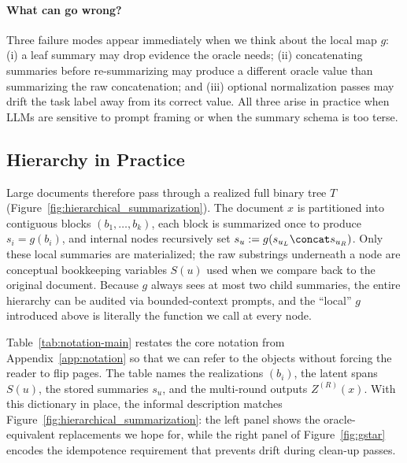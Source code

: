 \paragraph{What can go wrong?}
Three failure modes appear immediately when we think about the local map $g$: (i) a leaf summary may drop evidence the oracle needs; (ii) concatenating summaries before re-summarizing may produce a different oracle value than summarizing the raw concatenation; and (iii) optional normalization passes may drift the task label away from its correct value. All three arise in practice when LLMs are sensitive to prompt framing or when the summary schema is too terse.

\subsection{Hierarchy in Practice}

Large documents therefore pass through a realized full binary tree $T$ (Figure~\ref{fig:hierarchical_summarization}). The document $x$ is partitioned into contiguous blocks $(b_1,\dots,b_k)$, each block is summarized once to produce $s_i = g(b_i)$, and internal nodes recursively set $s_u := g(s_{u_L} \concat s_{u_R})$. Only these local summaries are materialized; the raw substrings underneath a node are conceptual bookkeeping variables $S(u)$ used when we compare back to the original document. Because $g$ always sees at most two child summaries, the entire hierarchy can be audited via bounded-context prompts, and the ``local'' $g$ introduced above is literally the function we call at every node.

Table~\ref{tab:notation-main} restates the core notation from Appendix~\ref{app:notation} so that we can refer to the objects without forcing the reader to flip pages. The table names the realizations $(b_i)$, the latent spans $S(u)$, the stored summaries $s_u$, and the multi-round outputs $Z^{(R)}(x)$. With this dictionary in place, the informal description matches Figure~\ref{fig:hierarchical_summarization}: the left panel shows the oracle-equivalent replacements we hope for, while the right panel of Figure~\ref{fig:gstar} encodes the idempotence requirement that prevents drift during clean-up passes.

